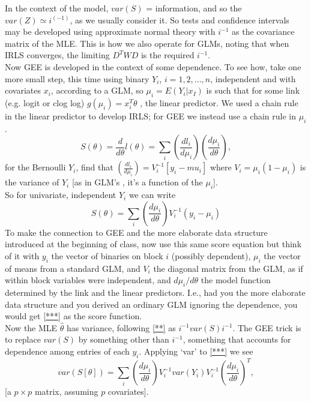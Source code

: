 \documentclass[11pt,a4paper]{article}
\begin{document}
In the context of the model, $var(S)$ = information, and so the $var(Z) \simeq i^(-1)$, as we usually consider it.  So tests and confidence intervals may be developed using approximate normal theory with $i^{-1}$ as the covariance matrix of the MLE.  This is how we also operate for GLMs, noting that when IRLS converges, the limiting $D^T W D$ is the required $i^{-1}$.\\
Now GEE is developed in the context of some dependence.  To see how, take one more small step, this time using  binary $Y_i$, $i=1,2,...,n$, independent and with covariates $x_i$, according to a GLM, so $\mu_i = E(Y_i|x_I)$ is such that for some link (e.g. logit or clog log) $g(\mu_i) = x_i^T \theta$ , the linear predictor.   We used a chain rule in the linear predictor to develop IRLS; for GEE we instead use a chain rule in $\mu_i$. 
 $$S(\theta) = \frac{d}{d\theta} l(\theta) = \sum_i \left(\frac{dl_i}{d \mu_i} \right) \left(\frac{d\mu_i}{d \theta} \right),$$
for the Bernoulli $Y_i$,  find that  $\left(\frac{dl_i}{d \mu_i} \right) =   V_i^{-1} [ y_i - mu_i ] $   where $V_i = \mu_i (1-\mu_i)$ is the variance of $Y_i$ [as in GLM's , it's a function of the $\mu_i$].\\
So for univariate, independent $Y_i$ we can write
\begin{equation}\label{***}
 S(\theta) = \sum_i \left(\frac{d\mu_i}{d \theta} \right) V_i^{-1}  (y_i - \mu_i )
\end{equation}
To make the connection to GEE and the more elaborate data structure introduced at the beginning of class, now use this same score equation  but think of it with $y_i$ the vector of binaries on block $i$ (possibly dependent), $\mu_i$ the vector of means from a standard GLM, and $V_i$ the diagonal matrix from the GLM, as if within block variables were independent, and $d\mu_i/d\theta$ the model function determined by the link and the linear predictors. I.e., had you the more elaborate data structure and you derived an ordinary GLM ignoring the dependence, you would get \eqref{***} as the score function.\\
Now the MLE $\hat{\theta}$ has variance, following \eqref{**} as $i^{-1} var(S) i^{-1}$. The GEE trick is to replace $var(S)$ by something other than $i^{-1}$, something that accounts for dependence among entries of each $y_i$.   Applying `var' to \eqref{***} we see
$$var( S[\theta] ) = \sum_i\left(\frac{d\mu_i}{d \theta} \right) V_i^{-1} var(Y_i) V_i^{-1}\left(\frac{d\mu_i}{d \theta} \right)^T,$$ 
[a $p\times p$ matrix, assuming $p$ covariates].\\
\end{document}
